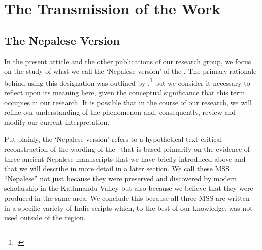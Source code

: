 \section{The Transmission of the Work}
\subsection{The Nepalese Version}

In the present article and the other publications of our research group, we focus on the study 
of what we call the `Nepalese version' of the \SS. The primary rationale behind using this 
designation was outlined by \citeauthor{kleb-2021b},\footcite[2--3]{kleb-2021b} but we 
consider it 
necessary to 
reflect upon its meaning here, given the conceptual significance that this term occupies in 
our 
research.
It is possible that in the course of our research, we will refine our understanding of the 
phenomenon and, consequently, review and modify our current interpretation.%

Put plainly, the `Nepalese version' refers to a hypothetical text-critical reconstruction of the 
wording of the \SS\ that is based primarily on the evidence of three ancient Nepalese 
manuscripts that we have briefly introduced above and that we will describe in more detail in 
a later section.  We call these MSS “Nepalese” not just because they were preserved and 
discovered by modern scholarship 
in the 
Kathmandu Valley
but also because we believe that they were produced in the same area. We conclude this 
because all three MSS are written in a specific variety of Indic scripts which, to the best of our 
knowledge, was not used outside of the region. 

